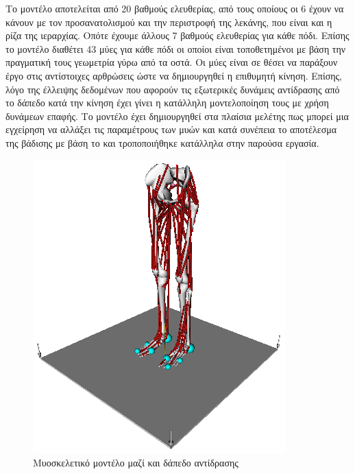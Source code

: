 Το μοντέλο αποτελείται από 20 βαθμούς ελευθερίας, από τους οποίους οι 6 έχουν να κάνουν με τον προσανατολισμού και την περιστροφή της λεκάνης, που είναι και η ρίζα της ιεραρχίας. Οπότε έχουμε άλλους 7 βαθμούς ελευθερίας για κάθε πόδι. Επίσης το μοντέλο διαθέτει 43 μύες για κάθε πόδι οι οποίοι είναι τοποθετημένοι με βάση την πραγματική τους γεωμετρία γύρω από τα οστά. Οι μύες είναι σε θέσει να παράξουν έργο στις αντίστοιχες αρθρώσεις ώστε να δημιουργηθεί η επιθυμητή κίνηση. Επίσης, λόγο της έλλειψης δεδομένων που αφορούν τις εξωτερικές δυνάμεις αντίδρασης από το δάπεδο κατά την κίνηση έχει γίνει η κατάλληλη μοντελοποίηση τους με χρήση δυνάμεων επαφής. Το μοντέλο έχει δημιουργηθεί στα πλαίσια μελέτης πως μπορεί μια εγχείρηση να αλλάξει τις παραμέτρους των μυών και κατά συνέπεια το αποτέλεσμα της βάδισης με βάση το \cite{delp90} και τροποποιήθηκε κατάλληλα στην παρούσα εργασία.

\begin{figure}[H]
    \centering
    \includegraphics[height=0.38\textheight, keepaspectratio]{fig/lower-limb-model.png}
    \caption{Μυοσκελετικό μοντέλο μαζί και δάπεδο αντίδρασης}
    \label{fig:lower-limb-model}
\end{figure}

